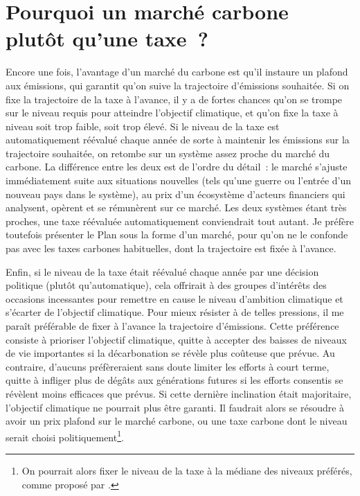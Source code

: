 \documentclass[a5paper,french,openany]{memoir}
\begin{document}

\section*{\normalsize Pourquoi un marché carbone plutôt qu'une taxe~?}\label{q:taxe}

Encore une fois, l'avantage d'un marché du carbone est qu'il instaure un plafond aux émissions, qui garantit qu'on suive la trajectoire d'émissions souhaitée. Si on fixe la trajectoire de la taxe à l'avance, il y a de fortes chances qu'on se trompe sur le niveau requis pour atteindre l'objectif climatique, et qu'on fixe la taxe à niveau soit trop faible, soit trop élevé. Si le niveau de la taxe est automatiquement réévalué chaque année de sorte à maintenir les émissions sur la trajectoire souhaitée, on retombe sur un système assez proche du marché du carbone. La différence entre les deux est de l'ordre du détail~: le marché s'ajuste immédiatement suite aux situations nouvelles (tels qu'une guerre ou l'entrée d'un nouveau pays dans le système), au prix d'un écosystème d'acteurs financiers qui analysent, opèrent et se rémunèrent sur ce marché. Les deux systèmes étant très proches, une taxe réévaluée automatiquement conviendrait tout autant. Je préfère toutefois présenter le Plan sous la forme d'un marché, pour qu'on ne le confonde pas avec les taxes carbones habituelles, dont la trajectoire est fixée à l'avance. 

Enfin, si le niveau de la taxe était réévalué chaque année par une décision politique (plutôt qu'automatique), cela offrirait à des groupes d'intérêts des occasions incessantes pour remettre en cause le niveau d'ambition climatique et s'écarter de l'objectif climatique. Pour mieux résister à de telles pressions, il me paraît préférable de fixer à l'avance la trajectoire d'émissions. Cette préférence consiste à prioriser l'objectif climatique, quitte à accepter des baisses de niveaux de vie importantes si la décarbonation se révèle plus coûteuse que prévue. 
Au contraire, d'aucuns préfèreraient sans doute limiter les efforts à court terme, quitte à infliger plus de dégâts aux générations futures si les efforts consentis se révèlent moins efficaces que prévus. Si cette dernière inclination était majoritaire, l'objectif climatique ne pourrait plus être garanti. Il faudrait alors se résoudre à avoir un prix plafond sur le marché carbone, ou une taxe carbone dont le niveau serait choisi politiquement\footnote{On pourrait alors fixer le niveau de la taxe à la médiane des niveaux préférés, comme proposé par \cite{weitzman_world_2017}.}. 
\end{document}
